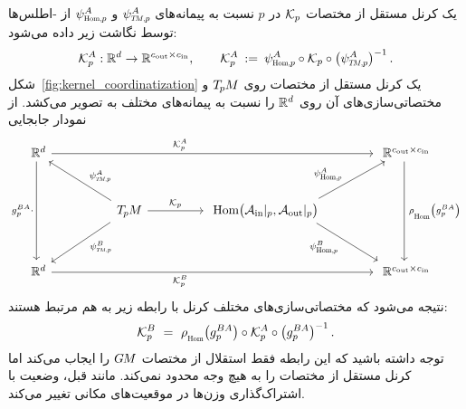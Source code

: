 یک کرنل مستقل از مختصات $\mathcal{K}_p$ در $p$ نسبت به پیمانه‌های $\psiTMp^A$ و $\psiHomp^A$ از -اطلس‌ها توسط نگاشت زیر داده می‌شود:
\begin{align}\label{eq:kernel_field_general_coord_expression}
    \Kp^A: \R^d \to \R^{\cout\times\cin}, \qquad
    \Kp^A\: :=\: \psiHomp^A \circ \Kp \circ \big(\psiTMp^A\big)^{-1} \,.
\end{align}
شکل~\ref{fig:kernel_coordinatization} یک کرنل مستقل از مختصات روی $T_{\mkern-1.5mu p}\mkern-.5muM$ و مختصاتی‌سازی‌های آن روی $\mathbb{R}^d$ را نسبت به پیمانه‌های مختلف به تصویر می‌کشد.
از نمودار جابجایی
\begin{equation}
    \begin{tikzcd}[column sep=45pt, row sep=30, font=\normalsize]
        \R^d    \arrow[rrr, pos=.4, "\Kp^A"]
                \arrow[dd, "g_p^{BA}\cdot"']
        & & &[-5pt]
        \R^{\cout\times\cin}
                \arrow[dd, "\,\rhoHom\big(g_p^{BA}\big)"]
        \\
        &
        \TpM    \arrow[r, "\Kp"]
                \arrow[lu, pos=.4, "\psiTMp^A"']
                \arrow[ld, pos=.4, "\psiTMp^B"]
        &
        \Hom\!\big(\Ain|_p,\Aout|_p\big)
                \arrow[ru, start anchor={[xshift=2.em]}, pos=.4, "\psiHomp^A"]
                \arrow[rd, start anchor={[xshift=2.em]}, pos=.4, "\psiHomp^B"']
        &
        \\
        \R^d    \arrow[rrr, pos=.4, "\Kp^B"']
        & & &
        \R^{\cout\times\cin}
    \end{tikzcd}
\end{equation}
نتیجه می‌شود که مختصاتی‌سازی‌های مختلف کرنل با رابطه زیر به هم مرتبط هستند:
\begin{align}\label{eq:kernel_field_unconstrained_gaugetrafo}
    \Kp^B \ =\ \rhoHom\big(g_p^{BA}\big) \circ \Kp^A \circ \big(g_p^{BA}\big)^{-1} \,.
\end{align}
توجه داشته باشید که این رابطه فقط استقلال از مختصات $G\mkern-1.4muM$ را ایجاب می‌کند اما کرنل مستقل از مختصات را به هیچ وجه محدود نمی‌کند.
مانند قبل، وضعیت با اشتراک‌گذاری وزن‌ها در موقعیت‌های مکانی تغییر می‌کند.


